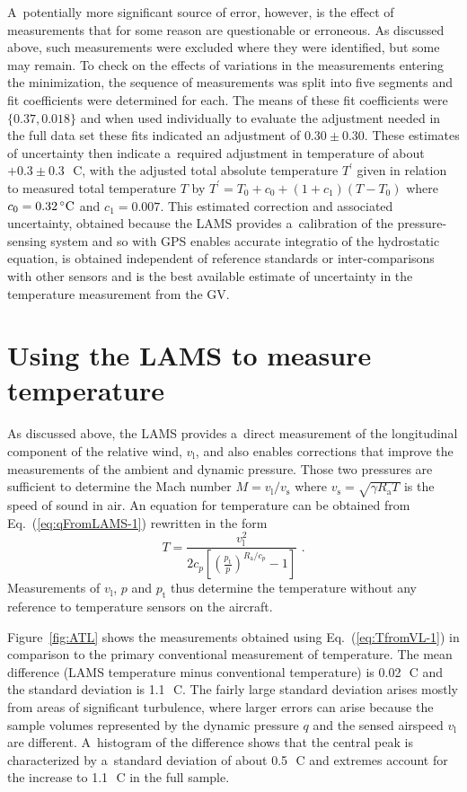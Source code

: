 \documentclass[amtd, online, hvmath]{copernicus}
\begin{document}
A~potentially more significant source of error, however, is the effect
of measurements that for some reason are questionable or erroneous.
As discussed above, such measurements were excluded where they were
identified, but some may remain. To check on the effects of variations
in the measurements entering the minimization, the sequence of
measurements was split into five segments and fit coefficients were
determined for each. The means of these fit coefficients were $\{0.37,
0.018\}$ and when used individually to evaluate the adjustment needed
in the full data set these fits indicated an adjustment of $0.30 \pm
0.30.$ These estimates of uncertainty then indicate a~required
adjustment in temperature of about $+0.3\pm 0.3$\,\unit{{\degree}C},
with the adjusted total absolute temperature $T^{\prime}$ given in
relation to measured total temperature $T$ by
$T^{\prime}=T_0+c_0+\left(1+c_1\right)\left(T-T_0\right)$ where
$c_0=0.32\,\unit{{\degree}C}$ and $c_1=0.007$. This estimated
correction and associated uncertainty, obtained because the LAMS
provides a~calibration of the pressure-sensing system and so with GPS
enables accurate integratio of the hydrostatic equation, is
obtained independent of reference standards or inter-comparisons with
other sensors and is the best available estimate of uncertainty in the
temperature measurement from the GV.

\section{Using the LAMS to measure temperature}

As discussed above, the LAMS provides a~direct measurement of the
longitudinal component of the relative wind, $v_{\mathrm{l}}$, and
also enables corrections that improve the measurements of the ambient
and dynamic pressure. Those two pressures are sufficient to determine
the Mach number $M=v_{\mathrm{l}}/v_{\mathrm{s}}$ where
$v_{\mathrm{s}}=\sqrt{\gamma R_{\mathrm{a}}T}$ is the speed of sound
in air. An equation for temperature can be obtained
from Eq.~(\ref{eq:qFromLAMS-1}) rewritten in the form
\begin{equation}
T=\frac{v_{\mathrm{l}}^2}{2c_p\left[\left(\frac{p_{\mathrm{t}}}{p}\right)^{R_{\mathrm{a}}/c_p}-1\right]}\,\,.\label{eq:TfromVL-1}
\end{equation}
Measurements of $v_{\mathrm{l}}$, $p$ and $p_{\mathrm{t}}$ thus
determine the temperature without any reference to temperature sensors
on the aircraft.

Figure~\ref{fig:ATL} shows the measurements obtained using
Eq.~(\ref{eq:TfromVL-1}) in comparison to the primary conventional
measurement of temperature.  The mean difference (LAMS temperature
minus conventional temperature) is 0.02\,\unit{{\degree}C} and the
standard deviation is 1.1\,\unit{{\degree}C}.  The fairly large
standard deviation arises mostly from areas of significant turbulence,
where larger errors can arise because the sample volumes represented
by the dynamic pressure $q$ and the sensed airspeed $v_{\mathrm{l}}$ are
different. A~histogram of the difference shows that the central peak
is characterized by a~standard deviation of about
0.5\,\unit{{\degree}C} and extremes account for the increase to
1.1\,\unit{{\degree}C} in the full sample.
\end{document}

